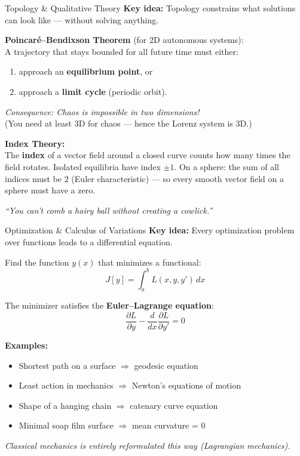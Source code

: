 \begin{frame}{Topology \& Qualitative Theory}
\textbf{Key idea:} Topology constrains what solutions can look like --- without solving anything.

\vspace{0.3cm}
\textbf{Poincar\'e--Bendixson Theorem} (for 2D autonomous systems): \\
A trajectory that stays bounded for all future time must either:
\begin{enumerate}
    \item approach an \textbf{equilibrium point}, or
    \item approach a \textbf{limit cycle} (periodic orbit).
\end{enumerate}

\textit{Consequence: Chaos is impossible in two dimensions!} \\
(You need at least 3D for chaos --- hence the Lorenz system is 3D.)

\vspace{0.3cm}
\textbf{Index Theory:} \\
The \textbf{index} of a vector field around a closed curve counts how many times the field rotates. Isolated equilibria have index $\pm 1$. On a sphere: the sum of all indices must be $2$ (Euler characteristic) --- so every smooth vector field on a sphere must have a zero.

\vspace{0.2cm}
\textit{``You can't comb a hairy ball without creating a cowlick.''}
\end{frame}


\begin{frame}{Optimization \& Calculus of Variations}
\textbf{Key idea:} Every optimization problem over functions leads to a differential equation.

\vspace{0.3cm}
Find the function $y(x)$ that minimizes a functional:
\[
J[y] = \int_a^b L(x, y, y')\, dx
\]

The minimizer satisfies the \textbf{Euler--Lagrange equation}:
\[
\frac{\partial L}{\partial y} - \frac{d}{dx}\frac{\partial L}{\partial y'} = 0
\]

\vspace{0.3cm}
\textbf{Examples:}
\begin{itemize}
    \item Shortest path on a surface $\Rightarrow$ geodesic equation
    \item Least action in mechanics $\Rightarrow$ Newton's equations of motion
    \item Shape of a hanging chain $\Rightarrow$ catenary curve equation
    \item Minimal soap film surface $\Rightarrow$ mean curvature = 0
\end{itemize}

\textit{Classical mechanics is entirely reformulated this way (Lagrangian mechanics).}
\end{frame}


